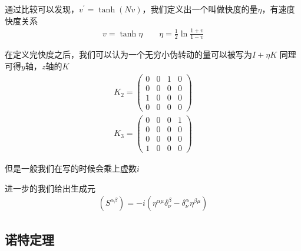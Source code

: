 \documentclass{article}
\begin{document}
通过比较可以发现，$v^\prime=\tanh(Nv)$，我们定义出一个叫做快度的量$\eta$，有速度快度关系
\begin{align*}
    v=\tanh\eta\quad\quad\eta=\frac{1}{2}\ln\frac{1+v}{1-v}
\end{align*}

在定义完快度之后，我们可以认为一个无穷小伪转动的量可以被写为$I+\eta K$
同理可得$y$轴，$z$轴的$K$
\begin{align*}
    K_2=
    \begin{pmatrix}
        0&0&1&0\\
        0&0&0&0\\
        1&0&0&0\\
        0&0&0&0
    \end{pmatrix}\\
    K_3=
    \begin{pmatrix}
        0&0&0&1\\
        0&0&0&0\\
        0&0&0&0\\
        1&0&0&0
    \end{pmatrix}
\end{align*}

但是一般我们在写的时候会乘上虚数$i$

进一步的我们给出生成元
\begin{align*}
    \left(S^{\alpha\beta}\right)=-i\left(\eta^{\alpha\mu}\delta^\beta_\nu-\delta^\alpha_\nu\eta^{\beta\mu}\right)
\end{align*}
















































\subsection{诺特定理}
\end{document}
